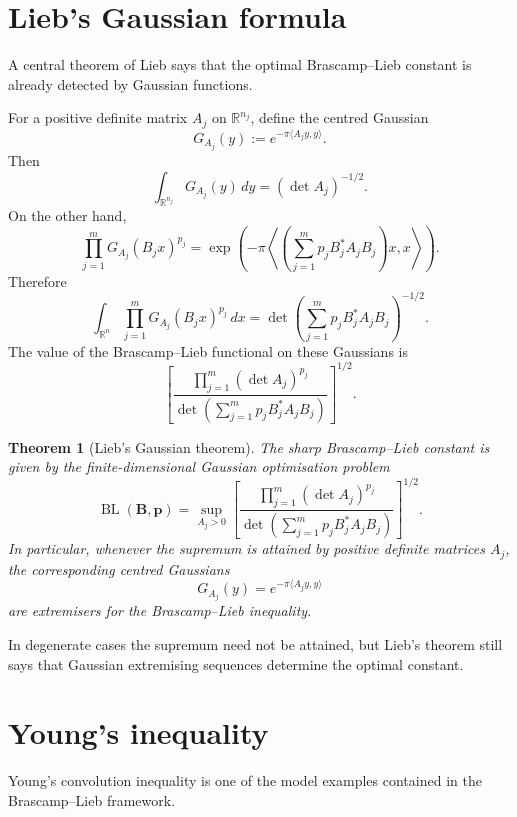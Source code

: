\documentclass[11pt]{article}
\newtheorem{theorem}{Theorem}
\DeclareMathOperator{\BL}{BL}
\begin{document}
\section{Lieb's Gaussian formula}

A central theorem of Lieb says that the optimal Brascamp--Lieb constant is
already detected by Gaussian functions.

For a positive definite matrix \(A_j\) on \(\mathbb R^{n_j}\), define the
centred Gaussian
\[
        G_{A_j}(y)
        :=
        e^{-\pi \langle A_jy,y\rangle}.
\]
Then
\[
        \int_{\mathbb R^{n_j}} G_{A_j}(y)\,dy
        =
        (\det A_j)^{-1/2}.
\]
On the other hand,
\[
        \prod_{j=1}^m G_{A_j}(B_jx)^{p_j}
        =
        \exp\left(
        -\pi
        \left\langle
        \left(\sum_{j=1}^m p_j B_j^*A_jB_j\right)x,x
        \right\rangle
        \right).
\]
Therefore
\[
        \int_{\mathbb R^n}
        \prod_{j=1}^m G_{A_j}(B_jx)^{p_j}\,dx
        =
        \det\left(
        \sum_{j=1}^m p_j B_j^*A_jB_j
        \right)^{-1/2}.
\]
The value of the Brascamp--Lieb functional on these Gaussians is
\[
        \left[
        \frac{
        \prod_{j=1}^m (\det A_j)^{p_j}
        }{
        \det\left(
        \sum_{j=1}^m p_j B_j^*A_jB_j
        \right)
        }
        \right]^{1/2}.
\]

\begin{theorem}[Lieb's Gaussian theorem]
The sharp Brascamp--Lieb constant is given by the finite-dimensional Gaussian
optimisation problem
\[
        \BL(\mathbf B,\mathbf p)
        =
        \sup_{A_j>0}
        \left[
        \frac{
        \prod_{j=1}^m (\det A_j)^{p_j}
        }{
        \det\left(
        \sum_{j=1}^m p_j B_j^*A_jB_j
        \right)
        }
        \right]^{1/2}.
\]
In particular, whenever the supremum is attained by positive definite matrices
\(A_j\), the corresponding centred Gaussians
\[
        G_{A_j}(y)=e^{-\pi\langle A_jy,y\rangle}
\]
are extremisers for the Brascamp--Lieb inequality.
\end{theorem}

In degenerate cases the supremum need not be attained, but Lieb's theorem still
says that Gaussian extremising sequences determine the optimal constant.

\section{Young's inequality}

Young's convolution inequality is one of the model examples contained in the
Brascamp--Lieb framework.
\end{document}
